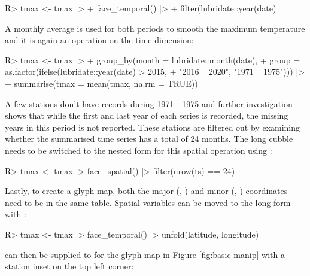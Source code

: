 \documentclass[
]{jss}
\begin{document}
\begin{CodeChunk}
\begin{CodeInput}
R> tmax <- tmax |> 
+   face_temporal() |>
+   filter(lubridate::year(date) %
\end{CodeInput}
\end{CodeChunk}

A monthly average is used for both periods to smooth the maximum temperature and it is again an operation on the time dimension:

\begin{CodeChunk}
\begin{CodeInput}
R> tmax <- tmax |>
+   group_by(month = lubridate::month(date), 
+          group = as.factor(ifelse(lubridate::year(date) > 2015, 
+                                   "2016 ~ 2020", "1971 ~ 1975"))) |>
+   summarise(tmax = mean(tmax, na.rm = TRUE))
\end{CodeInput}
\end{CodeChunk}

A few stations don't have records during 1971 - 1975 and further investigation shows that while the first and last year of each series is recorded, the missing years in this period is not reported. These stations are filtered out by examining whether the summarised time series has a total of 24 months. The long cubble needs to be switched to the nested form for this spatial operation using :

\begin{CodeChunk}
\begin{CodeInput}
R> tmax <- tmax |> face_spatial() |> filter(nrow(ts) == 24) 
\end{CodeInput}
\end{CodeChunk}

Lastly, to create a glyph map, both the major (, ) and minor (, ) coordinates need to be in the same table. Spatial variables can be moved to the long form with :

\begin{CodeChunk}
\begin{CodeInput}
R> tmax <- tmax |> face_temporal() |> unfold(latitude, longitude)
\end{CodeInput}
\end{CodeChunk}

 can then be supplied to  for the glyph map in Figure \ref{fig:basic-manip} with a station inset on the top left corner:
\end{document}
